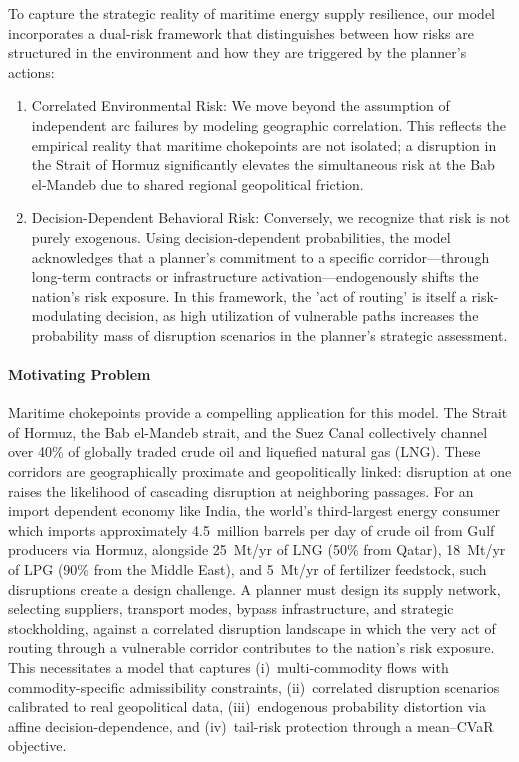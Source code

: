 \documentclass[final,3p,authoryear]{elsarticle}
\theoremstyle{definition}
\begin{document}
To capture the strategic reality of maritime energy supply resilience, our model incorporates a dual-risk framework that distinguishes between how risks are structured in the environment and how they are triggered by the planner’s actions:
\begin{enumerate}
    \item Correlated Environmental Risk: We move beyond the assumption of independent arc failures by modeling geographic correlation. This reflects the empirical reality that maritime chokepoints are not isolated; a disruption in the Strait of Hormuz significantly elevates the simultaneous risk at the Bab el-Mandeb due to shared regional geopolitical friction.
    \item Decision-Dependent Behavioral Risk: Conversely, we recognize that risk is not purely exogenous. Using decision-dependent probabilities, the model acknowledges that a planner’s commitment to a specific corridor—through long-term contracts or infrastructure activation—endogenously shifts the nation’s risk exposure. In this framework, the 'act of routing' is itself a risk-modulating decision, as high utilization of vulnerable paths increases the probability mass of disruption scenarios in the planner’s strategic assessment. 
\end{enumerate}

\paragraph{Motivating Problem}
Maritime chokepoints provide a compelling application for this model. The Strait of Hormuz, the Bab el-Mandeb strait, and the Suez Canal collectively channel over 40\% of globally traded crude oil and liquefied natural gas (LNG).
These corridors are geographically proximate and geopolitically linked:
disruption at one raises the likelihood of cascading disruption at
neighboring passages. For an import dependent economy like India, the world's third-largest energy consumer which
imports approximately 4.5~million barrels per day of crude oil from
Gulf producers via Hormuz, alongside 25~Mt/yr of LNG (50\% from
Qatar), 18~Mt/yr of LPG (90\% from the Middle East), and 5~Mt/yr of
fertilizer feedstock, such disruptions create a design challenge. 
A planner must design
its supply network, selecting suppliers, transport modes, bypass
infrastructure, and strategic stockholding, against a correlated
disruption landscape in which the very act of routing through a vulnerable
corridor contributes to the nation's risk exposure. This necessitates a model that captures (i)~multi-commodity flows with commodity-specific
admissibility constraints, (ii)~correlated disruption scenarios calibrated
to real geopolitical data, (iii)~endogenous probability distortion via
affine decision-dependence, and (iv)~tail-risk protection through a mean--CVaR objective.
\end{document}
